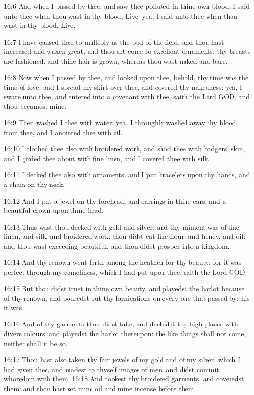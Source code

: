 16:6 And when I passed by thee, and saw thee polluted in thine own
blood, I said unto thee when thou wast in thy blood, Live; yea, I said
unto thee when thou wast in thy blood, Live.

16:7 I have caused thee to multiply as the bud of the field, and thou
hast increased and waxen great, and thou art come to excellent
ornaments: thy breasts are fashioned, and thine hair is grown, whereas
thou wast naked and bare.

16:8 Now when I passed by thee, and looked upon thee, behold, thy time
was the time of love; and I spread my skirt over thee, and covered thy
nakedness: yea, I sware unto thee, and entered into a covenant with
thee, saith the Lord GOD, and thou becamest mine.

16:9 Then washed I thee with water; yea, I throughly washed away thy
blood from thee, and I anointed thee with oil.

16:10 I clothed thee also with broidered work, and shod thee with
badgers' skin, and I girded thee about with fine linen, and I covered
thee with silk.

16:11 I decked thee also with ornaments, and I put bracelets upon thy
hands, and a chain on thy neck.

16:12 And I put a jewel on thy forehead, and earrings in thine ears,
and a beautiful crown upon thine head.

16:13 Thus wast thou decked with gold and silver; and thy raiment was
of fine linen, and silk, and broidered work; thou didst eat fine
flour, and honey, and oil: and thou wast exceeding beautiful, and thou
didst prosper into a kingdom.

16:14 And thy renown went forth among the heathen for thy beauty: for
it was perfect through my comeliness, which I had put upon thee, saith
the Lord GOD.

16:15 But thou didst trust in thine own beauty, and playedst the
harlot because of thy renown, and pouredst out thy fornications on
every one that passed by; his it was.

16:16 And of thy garments thou didst take, and deckedst thy high
places with divers colours, and playedst the harlot thereupon: the
like things shall not come, neither shall it be so.

16:17 Thou hast also taken thy fair jewels of my gold and of my
silver, which I had given thee, and madest to thyself images of men,
and didst commit whoredom with them, 16:18 And tookest thy broidered
garments, and coveredst them: and thou hast set mine oil and mine
incense before them.

